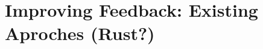 \section{Improving Feedback: Existing Aproches (Rust?)} %
  \label{Improving Feedback: Existing Aproches (Rust?)} %


\todo






